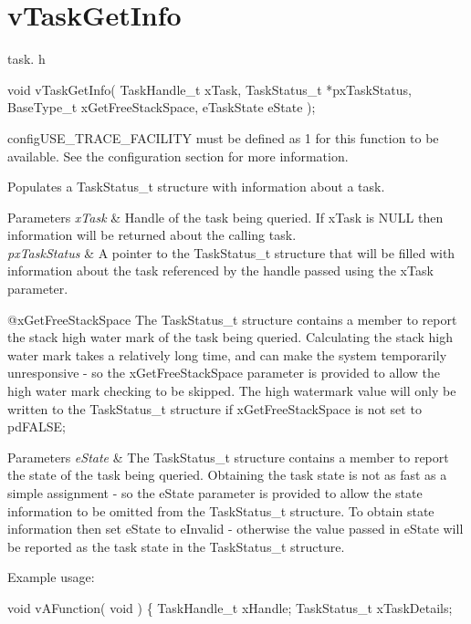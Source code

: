 \hypertarget{group__v_task_get_info}{}\section{v\+Task\+Get\+Info}
\label{group__v_task_get_info}
task. h 
\begin{DoxyPre}void vTaskGetInfo( TaskHandle\_t xTask, TaskStatus\_t *pxTaskStatus, BaseType\_t xGetFreeStackSpace, eTaskState eState );\end{DoxyPre}


config\+U\+S\+E\+\_\+\+T\+R\+A\+C\+E\+\_\+\+F\+A\+C\+I\+L\+I\+TY must be defined as 1 for this function to be available. See the configuration section for more information.

Populates a Task\+Status\+\_\+t structure with information about a task.


\begin{DoxyParams}{Parameters}
{\em x\+Task} & Handle of the task being queried. If x\+Task is N\+U\+LL then information will be returned about the calling task.\\
\hline
{\em px\+Task\+Status} & A pointer to the Task\+Status\+\_\+t structure that will be filled with information about the task referenced by the handle passed using the x\+Task parameter.\\
\hline
\end{DoxyParams}
@x\+Get\+Free\+Stack\+Space The Task\+Status\+\_\+t structure contains a member to report the stack high water mark of the task being queried. Calculating the stack high water mark takes a relatively long time, and can make the system temporarily unresponsive -\/ so the x\+Get\+Free\+Stack\+Space parameter is provided to allow the high water mark checking to be skipped. The high watermark value will only be written to the Task\+Status\+\_\+t structure if x\+Get\+Free\+Stack\+Space is not set to pd\+F\+A\+L\+SE;


\begin{DoxyParams}{Parameters}
{\em e\+State} & The Task\+Status\+\_\+t structure contains a member to report the state of the task being queried. Obtaining the task state is not as fast as a simple assignment -\/ so the e\+State parameter is provided to allow the state information to be omitted from the Task\+Status\+\_\+t structure. To obtain state information then set e\+State to e\+Invalid -\/ otherwise the value passed in e\+State will be reported as the task state in the Task\+Status\+\_\+t structure.\\
\hline
\end{DoxyParams}
Example usage\+: 
\begin{DoxyPre}
void vAFunction( void )
\{
TaskHandle\_t xHandle;
TaskStatus\_t xTaskDetails;\end{DoxyPre}



